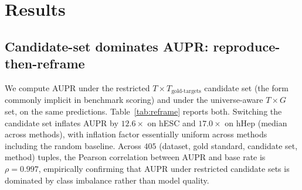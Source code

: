 \documentclass[sigconf]{acmart}
\begin{document}
\section{Results}
\label{sec:results}


\subsection{Candidate-set dominates AUPR: reproduce-then-reframe}
\label{sec:cand_inflation}

We compute AUPR under the restricted $T \times T_{\text{gold-targets}}$
candidate set (the form commonly implicit in benchmark scoring) and
under the universe-aware $T \times G$ set, on the same predictions.
Table~\ref{tab:reframe} reports both. Switching the candidate set
inflates AUPR by $12.6\times$ on hESC and $17.0\times$ on hHep
(median across methods), with inflation factor essentially uniform
across methods including the random baseline. Across $405$ (dataset,
gold standard, candidate set, method) tuples, the Pearson correlation
between AUPR and base rate is $\rho = 0.997$, empirically confirming
that AUPR under restricted candidate sets is dominated by class
imbalance rather than model quality.
\end{document}
